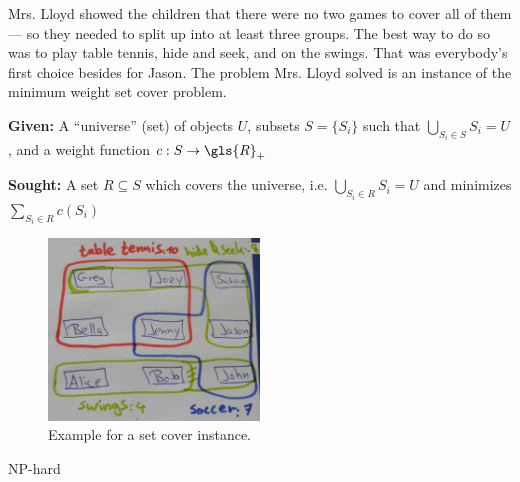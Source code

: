 Mrs. Lloyd showed the children that there were no two games to cover
all of them --- so they needed to split up into at least three groups.
The best way to do so was to play table tennis, hide and seek, and
on the swings. That was everybody's first choice besides for Jason.
The problem Mrs. Lloyd solved is an instance of the minimum weight 
set cover problem.

\begin{problem}\label{prob:mwsc}
  \hfill
  \begin{labeling}{\hspace{4em}}
    \item[\textbf{Given:}]
      A ``universe'' (set) of objects \(U\), 
      subsets \(S = \{S_i\}\)
      such that \(\bigcup\limits_{S_i \in S} S_i = U\),
      and a weight function \(c : S \to \gls{R}_+\)
    \item[\textbf{Sought:}]
      A set \(R \subseteq S\)
      which covers the universe, i.e. 
      \(\bigcup\limits_{S_i \in R} S_i = U\)
      and minimizes \(\sum\limits_{S_i \in R} c(S_i)\)
  \end{labeling}
\end{problem}




\begin{figure}[ht]
  \centering
  \includegraphics[width=0.5\textwidth]{img/example_set_cover.jpg}
  \caption{\label{fig:example_set_cover}Example for a set cover instance.}
\end{figure}

NP-hard \cite{set_cover}
